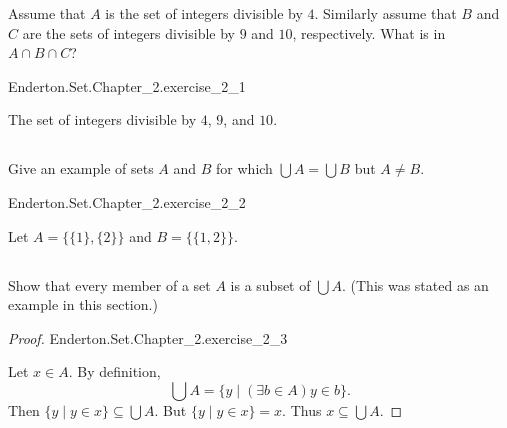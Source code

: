 \documentclass{report}
\begin{document}
Assume that $A$ is the set of integers divisible by $4$.
Similarly assume that $B$ and $C$ are the sets of integers divisible by $9$ and
  $10$, respectively.
What is in $A \cap B \cap C$?

\begin{answer}

    {Enderton.Set.Chapter\_2.exercise\_2\_1}

  The set of integers divisible by $4$, $9$, and $10$.

\end{answer}

\subsection{}%

Give an example of sets $A$ and $B$ for which $\bigcup A = \bigcup B$ but
  $A \neq B$.

\begin{answer}

    {Enderton.Set.Chapter\_2.exercise\_2\_2}

  Let $A = \{\{1\}, \{2\}\}$ and $B = \{\{1, 2\}\}$.

\end{answer}

\subsection{}%

Show that every member of a set $A$ is a subset of $\bigcup A$.
(This was stated as an example in this section.)

\begin{proof}

    {Enderton.Set.Chapter\_2.exercise\_2\_3}

  Let $x \in A$.
  By definition, $$\bigcup A = \{ y \mid (\exists b \in A) y \in b\}.$$
  Then $\{ y \mid y \in x\} \subseteq \bigcup A$.
  But $\{ y \mid y \in x\} = x$.
  Thus $x \subseteq \bigcup A$.

\end{proof}

\subsection{}%
\end{document}
